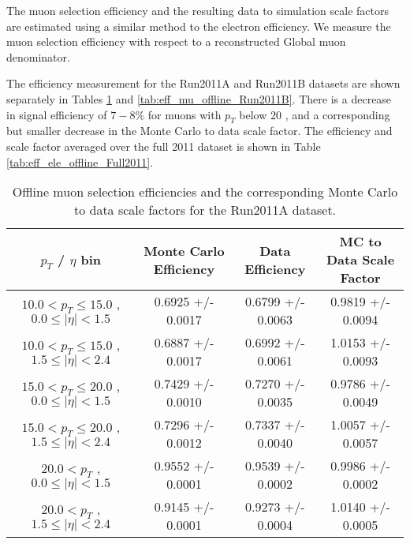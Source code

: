 
The muon selection efficiency and the resulting data to simulation
scale factors are estimated using a similar method to the electron efficiency. 
We measure the muon selection efficiency with respect to a reconstructed Global muon
denominator. 

The efficiency measurement for the Run2011A and Run2011B datasets are shown
separately in Tables \ref{tab:eff_mu_offline_Run2011A} and \ref{tab:eff_mu_offline_Run2011B}. 
There is a decrease in signal efficiency of $7-8\%$ for muons with 
$p_{T}$ below $20$ \GeV, and a corresponding but smaller decrease in the 
Monte Carlo to data scale factor. The efficiency and scale factor
averaged over the full 2011 dataset is shown in Table \ref{tab:eff_ele_offline_Full2011}.




 \begin{table}[!ht]
 \begin{center} 
 \begin{tabular}{|c|c|c|c|}
 \hline
 $p_{T}$ / $\eta$ bin    &  Monte Carlo Efficiency    &  Data Efficiency   &  MC to Data Scale Factor \\   \hline           
$ 10.0 < p_{T} \le  15.0$ , $  0.0  \le |\eta| <   1.5$   &       0.6925 +/- 0.0017   &       0.6799 +/- 0.0063   &       0.9819 +/- 0.0094   \\   
\hline
$ 10.0 < p_{T} \le  15.0$ , $  1.5  \le |\eta| <   2.4$   &       0.6887 +/- 0.0017   &       0.6992 +/- 0.0061   &       1.0153 +/- 0.0093   \\   
\hline
$ 15.0 < p_{T} \le  20.0$ , $  0.0  \le |\eta| <   1.5$   &       0.7429 +/- 0.0010   &       0.7270 +/- 0.0035   &       0.9786 +/- 0.0049   \\   
\hline
$ 15.0 < p_{T} \le  20.0$ , $  1.5  \le |\eta| <   2.4$   &       0.7296 +/- 0.0012   &       0.7337 +/- 0.0040   &       1.0057 +/- 0.0057   \\   
\hline
$ 20.0 < p_{T} $ , $  0.0  \le |\eta| <   1.5$   &       0.9552 +/- 0.0001   &       0.9539 +/- 0.0002   &       0.9986 +/- 0.0002   \\   
\hline
$ 20.0 < p_{T} $ , $  1.5  \le |\eta| <   2.4$   &       0.9145 +/- 0.0001   &       0.9273 +/- 0.0004   &       1.0140 +/- 0.0005   \\   
\hline
\end{tabular}
\caption{Offline muon selection efficiencies and the corresponding Monte Carlo to data scale factors for the
Run2011A dataset.}
\label{tab:eff_mu_offline_Run2011A}
\end{center}
\end{table}


